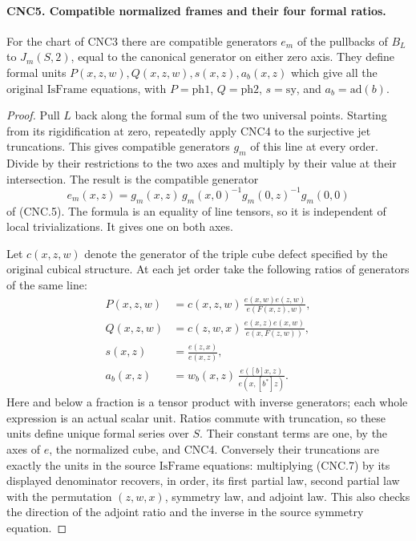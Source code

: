 \documentclass[11pt,a4paper]{article}
\numberwithin{equation}{section}
\theoremstyle{remark}\newtheorem{remark}[theorem]{Remark}
\begin{document}
\paragraph{CNC5. Compatible normalized frames and their four formal ratios.}
\label{claim:CNC5}
For the chart of CNC3 there are compatible generators \(e_m\) of
the pullbacks of \(B_L\) to \(J_m(S,2)\), equal to the canonical
generator on either zero axis.  They define formal units
\(P(x,z,w),Q(x,z,w),s(x,z),a_b(x,z)\) which give all the original
\(\mathrm{IsFrame}\) equations, with \(P=\mathrm{ph1}\),
\(Q=\mathrm{ph2}\), \(s=\mathrm{sy}\), and
\(a_b=\mathrm{ad}(b)\).
\begin{proof}
Pull \(L\) back along the formal sum of the two universal points.
Starting from its rigidification at zero, repeatedly apply CNC4 to the
surjective jet truncations.  This gives compatible generators \(g_m\)
of this line at every order.  Divide by their restrictions to the two
axes and multiply by their value at their intersection.  The result is
the compatible generator
\[
 e_m(x,z)=g_m(x,z)\,g_m(x,0)^{-1}g_m(0,z)^{-1}g_m(0,0)
                                                               \tag{CNC.6}
\]
of (CNC.5).  The formula is an equality of line tensors, so it is
independent of local trivializations.  It gives one on both axes.

Let \(c(x,z,w)\) denote the generator of the triple cube defect
specified by the original cubical structure.  At each jet order take
the following ratios of generators of the same line:
\[
\begin{aligned}
 P(x,z,w)&=c(x,z,w)\,
              \frac{e(x,w)e(z,w)}{e(F(x,z),w)},\\
 Q(x,z,w)&=c(z,w,x)\,
              \frac{e(x,z)e(x,w)}{e(x,F(z,w))},\\
 s(x,z)&=\frac{e(z,x)}{e(x,z)},\\
 a_b(x,z)&=w_b(x,z)\,
                    \frac{e([b]x,z)}{e(x,[b^*]z)}.
\end{aligned}                                                   \tag{CNC.7}
\]
Here and below a fraction is a tensor product with inverse generators;
each whole expression is an actual scalar unit.  Ratios commute with
truncation, so these units define unique formal series over \(S\).
Their constant terms are one, by the axes of \(e\), the normalized
cube, and CNC4.  Conversely their truncations are exactly the units in
the source \(\mathrm{IsFrame}\) equations: multiplying (CNC.7)
by its displayed denominator recovers, in order, its first partial
law, second partial law with the permutation \((z,w,x)\), symmetry
law, and adjoint law.  This also checks the direction of the adjoint
ratio and the inverse in the source symmetry equation.
\end{proof}
\end{document}
